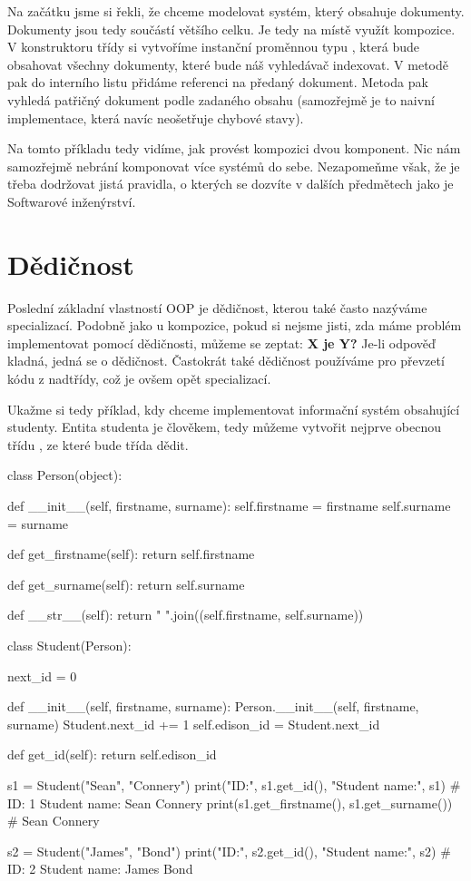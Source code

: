 Na začátku jsme si řekli, že chceme modelovat systém, který obsahuje dokumenty. Dokumenty jsou tedy součástí
většího celku. Je tedy na místě využít kompozice.
V konstruktoru třídy  si vytvoříme instanční proměnnou typu , která bude
obsahovat všechny dokumenty, které bude náš vyhledávač indexovat. V metodě  pak do
interního listu přidáme referenci na předaný dokument. Metoda  pak vyhledá patřičný dokument
podle zadaného obsahu (samozřejmě je to naivní implementace, která navíc neošetřuje chybové stavy).

Na tomto příkladu tedy vidíme, jak provést kompozici dvou komponent. Nic nám samozřejmě nebrání komponovat
více systémů do sebe. Nezapomeňme však, že je třeba dodržovat jistá pravidla, o kterých se dozvíte v dalších
předmětech jako je Softwarové inženýrství.

\section{Dědičnost}

Poslední základní vlastností OOP je dědičnost, kterou také často nazýváme specializací. Podobně jako
u kompozice, pokud si nejsme jisti, zda máme problém implementovat pomocí dědičnosti, můžeme se zeptat:
\textbf{X je Y?} Je-li odpověď kladná, jedná se o dědičnost. Častokrát také dědičnost používáme
pro převzetí kódu z nadtřídy, což je ovšem opět specializací.

Ukažme si tedy příklad, kdy chceme implementovat informační systém obsahující studenty. Entita studenta
je člověkem, tedy můžeme vytvořit nejprve obecnou třídu , ze které bude
třída  dědit.

\begin{python}
class Person(object):

    def __init__(self, firstname, surname):
        self.firstname = firstname
        self.surname = surname

    def get_firstname(self):
        return self.firstname

    def get_surname(self):
        return self.surname

    def __str__(self):
        return " ".join((self.firstname, self.surname))


class Student(Person):

    next_id = 0

    def __init__(self, firstname, surname):
        Person.__init__(self, firstname, surname)
        Student.next_id += 1
        self.edison_id = Student.next_id

    def get_id(self):
        return self.edison_id


s1 = Student("Sean", "Connery")
print("ID:", s1.get_id(), "Student name:", s1)
# ID: 1 Student name: Sean Connery
print(s1.get_firstname(), s1.get_surname()) # Sean Connery

s2 = Student("James", "Bond")
print("ID:", s2.get_id(), "Student name:", s2)
# ID: 2 Student name: James Bond
\end{python}


